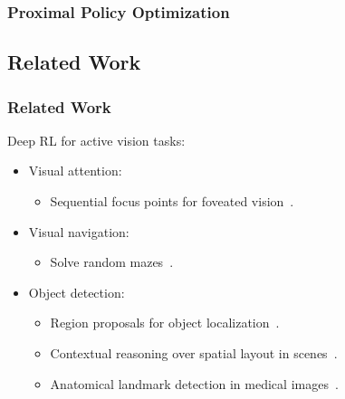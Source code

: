 \begin{frame}
    \frametitle{Proximal Policy Optimization}

    
\end{frame}

\subsection{Related Work}

\begin{frame}
    \frametitle{Related Work}

    Deep RL for active vision tasks:

    \begin{itemize}
        \item Visual attention:
        \begin{itemize}
            \item Sequential focus points for foveated vision~\cite{mnih_recurrent_2014}.
        \end{itemize}
        \item Visual navigation:
        \begin{itemize}
            \item Solve random mazes~\cite{mirowski_learning_2017}.
        \end{itemize}
        \item Object detection:
        \begin{itemize}
            \item Region proposals for object localization~\cite{caicedo_active_2015}.
            \item Contextual reasoning over spatial layout in scenes~\cite{chen_spatial_2017}.
            \item Anatomical landmark detection in medical images~\cite{ghesu_multi-scale_2019}.
        \end{itemize}        
    \end{itemize}
\end{frame}